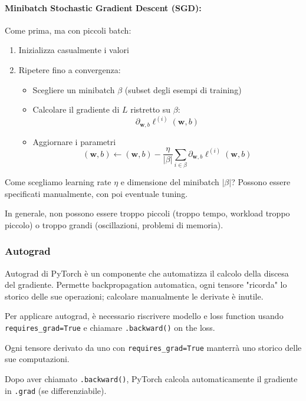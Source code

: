 \paragraph{Minibatch Stochastic Gradient Descent (SGD):} Come prima, ma con piccoli batch:
\begin{enumerate}
    \item Inizializza casualmente i valori
    
    \item Ripetere fino a convergenza:
    \begin{itemize}
        \item Scegliere un minibatch $\beta$ (subset degli esempi di training)
        
        \item Calcolare il gradiente di $L$ ristretto su $\beta$:
        $$ \partial_{\bm w, b} \ell^{(i)} (\bm w, b) $$
        
        \item Aggiornare i parametri 
        $$ (\bm w, b) \leftarrow (\bm w, b) - \frac{\eta}{|\beta|} \sum_{i \in \beta} \partial_{\bm w, b} \ell^{(i)} (\bm w, b) $$
    \end{itemize}
\end{enumerate}

Come scegliamo learning rate $\eta$ e dimensione del minibatch $|\beta|$? Possono essere specificati manualmente, con poi eventuale tuning. 

In generale, non possono essere troppo piccoli (troppo tempo, workload troppo piccolo) o troppo grandi (oscillazioni, problemi di memoria).

\subsubsection{Autograd}

Autograd di PyTorch è un componente che automatizza il calcolo della discesa del gradiente. Permette backpropagation automatica, ogni tensore "ricorda" lo storico delle sue operazioni; calcolare manualmente le derivate è inutile.

Per applicare autograd, è necessario riscrivere modello e loss function usando \texttt{requires\_grad=True} e chiamare \texttt{.backward()} on the loss.

Ogni tensore derivato da uno con \texttt{requires\_grad=True} manterrà uno storico delle sue computazioni. 

Dopo aver chiamato \texttt{.backward()}, PyTorch calcola automaticamente il gradiente in \texttt{.grad} (se differenziabile). 

